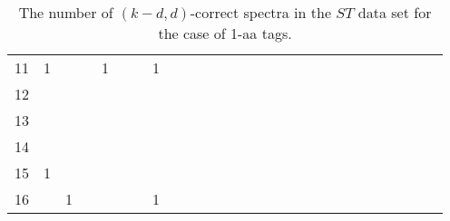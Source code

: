 \documentclass{article}[12pt]
\begin{document}
\begin{landscape}
\begin{table}[h]
{\begin{tabular}{|c|c|
c|c|c|c|c|c|c|c|c|c|c|c|c|c|c|c|c|c|c|c|c|c|c|c|c|}
11  & 1 &  &  & 1 &  &  & 1 &  &  &  &  &  &  &  &  &  &  &  &  &  &  &  &  &  &  & \\

12  &  &  &  &  &  &  &  &  &  &  &  &  &  &  &  &  &  &  &  &  &  &  &  &  &  & \\

13  &  &  &  &  &  &  &  &  &  &  &  &  &  &  &  &  &  &  &  &  &  &  &  &  &  & \\

14  &  &  &  &  &  &  &  &  &  &  &  &  &  &  &  &  &  &  &  &  &  &  &  &  &  & \\

15  & 1 &  &  &  &  &  &  &  &  &  &  &  &  &  &  &  &  &  &  &  &  &  &  &  &  & \\

16  &  & 1 &  &  &  &  & 1 &  &  &  &  &  &  &  &  &  &  &  &  &  &  &  &  &  &  & \\

  \hline
\end{tabular}
\par}
\centering
\caption{The number of $(k-d,d)$-correct spectra in the $ST$ data set for the case of 1-aa tags.}
\vspace{3mm}
\label{table:kd-1-correct-ST}
\end{table}
\end{landscape}
\end{document}
